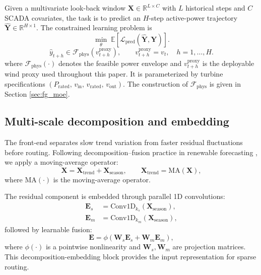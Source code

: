 ﻿\documentclass[review,1p,times]{elsarticle}
\begin{document}
Given a multivariate look-back window $\mathbf{X}\in\mathbb{R}^{L\times C}$ with $L$ historical steps and $C$ SCADA covariates, the task is to predict an $H$-step active-power trajectory $\hat{\mathbf{Y}}\in\mathbb{R}^{H\times 1}$. The constrained learning problem is
\begin{equation}
\min_{\theta} \; \mathbb{E}\left[\mathcal{L}_{\text{pred}}(\hat{\mathbf{Y}}, \mathbf{Y})\right].
\end{equation}
\begin{equation}
\hat{y}_{t+h} \in \mathcal{F}_{\text{phys}}(v_{t+h}^{\mathrm{proxy}}),\qquad
v_{t+h}^{\mathrm{proxy}}=v_t,\quad h=1,\ldots,H.
\end{equation}
where $\mathcal{F}_{\text{phys}}(\cdot)$ denotes the feasible power envelope and $v_{t+h}^{\mathrm{proxy}}$ is the deployable wind proxy used throughout this paper. It is parameterized by turbine specifications $(P_{\mathrm{rated}},\,v_{\mathrm{in}},\,v_{\mathrm{rated}},\,v_{\mathrm{out}})$. The construction of $\mathcal{F}_{\text{phys}}$ is given in Section \ref{sec:fg_moe}.

\subsection{Multi-scale decomposition and embedding}
\label{subsec:decomposition}

The front-end separates slow trend variation from faster residual fluctuations before routing. Following decomposition--fusion practice in renewable forecasting \citep{li2023vmdcnn,ma2022gcnwind}, we apply a moving-average operator:
\begin{equation}
\mathbf{X} = \mathbf{X}_{\text{trend}} + \mathbf{X}_{\text{season}}, \qquad 
\mathbf{X}_{\text{trend}} = \text{MA}(\mathbf{X}),
\end{equation}
where $\text{MA}(\cdot)$ is the moving-average operator.

The residual component is embedded through parallel 1D convolutions:
\begin{align}
\mathbf{E}_s &= \text{Conv1D}_{k_s}(\mathbf{X}_{\text{season}}), \\
\mathbf{E}_m &= \text{Conv1D}_{k_m}(\mathbf{X}_{\text{season}}),
\end{align}
followed by learnable fusion:
\begin{equation}
\mathbf{E} = \phi\!\left(\mathbf{W}_s\mathbf{E}_s + \mathbf{W}_m\mathbf{E}_m\right),
\end{equation}
where $\phi(\cdot)$ is a pointwise nonlinearity and $\mathbf{W}_s,\mathbf{W}_m$ are projection matrices. This decomposition-embedding block provides the input representation for sparse routing.\label{sec:embedding}
\end{document}

